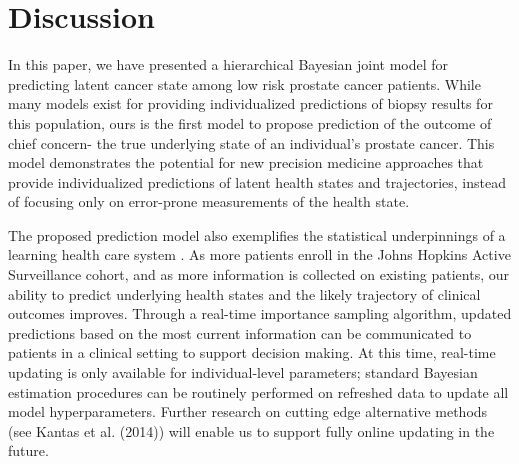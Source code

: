 \documentclass[12pt, letterpaper]{article}
\begin{document}
\section{Discussion}
In this paper, we have presented a hierarchical Bayesian joint model for predicting latent cancer state among low risk prostate cancer patients. While many models exist for providing individualized predictions of biopsy results for this population, ours is the first model to propose prediction of the outcome of chief concern- the true underlying state of an individual's prostate cancer. This model demonstrates the potential for new precision medicine approaches that provide individualized predictions of latent health states and trajectories, instead of focusing only on error-prone measurements of the health state. 

The proposed prediction model also exemplifies the statistical underpinnings of a learning health care system \cite{Smith2013}. As more patients enroll in the Johns Hopkins Active Surveillance cohort, and as more information is collected on existing patients, our ability to predict underlying health states and the likely trajectory of clinical outcomes improves. Through a real-time importance sampling algorithm, updated predictions based on the most current information can be communicated to patients in a clinical setting to support decision making. At this time, real-time updating is only available for individual-level parameters; standard Bayesian estimation procedures can be routinely performed on refreshed data to update all  model hyperparameters. Further research on cutting edge alternative methods (see Kantas et al. (2014)\nocite{Kantas2014}) will enable us to support fully online updating in the future.  
\end{document}
